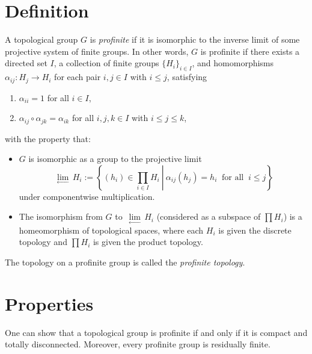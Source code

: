 \documentclass[12pt]{article}
\newcommand{\ilim}{\,\underset{\longleftarrow}{\lim}\,}
\begin{document}
\section{Definition}
A topological group $G$ is \emph{profinite} if it is isomorphic to the inverse limit of some projective system of finite groups. In other words, $G$ is profinite if there exists a directed set $I$, a collection of finite groups $\{H_i\}_{i \in I}$, and homomorphisms $\alpha_{ij}\colon H_j \to H_i$ for each pair $i,j \in I$ with $i \leq j$, satisfying
\begin{enumerate}
\item $\alpha_{ii} = 1$ for all $i \in I$,
\item $\alpha_{ij} \circ \alpha_{jk} = \alpha_{ik}$ for all $i,j,k \in I$ with $i \leq j \leq k$,
\end{enumerate}
with the property that:
\begin{itemize}
\item $G$ is isomorphic as a group to the projective limit
$$
\ilim H_i := \left\{\left.(h_i) \in \prod_{i \in I} H_i\ \right|\ \alpha_{ij}(h_j) = h_i\ \text{ for all }\ i \leq j\right\}
$$
under componentwise multiplication.
\item The isomorphism from $G$ to $\ilim H_i$ (considered as a subspace of $\prod H_i$) is a homeomorphism of topological spaces, where each $H_i$ is given the discrete topology and $\prod H_i$ is given the product topology.
\end{itemize}
The topology on a profinite group is called the {\em profinite topology}.
\section{Properties}
One can show that a topological group is profinite if and only if it is compact and totally disconnected. Moreover, every profinite group is residually finite.

\end{document}
